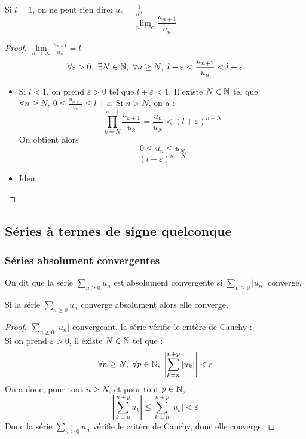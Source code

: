 \documentclass[../main.tex]{subfile}
\begin{document}
\begin{rema}
	Si $l = 1$, on ne peut rien dire:
	$u_n = \frac{1}{n^\alpha}$\\
	$$\lim\limits_{n \to \infty} \frac{u_{n+1}}{u_n}$$
\end{rema}

\begin{proof}
	$\lim\limits_{n \to \infty} \frac{u_{n+1}}{u_n} = l$\\
	$$\forall \varepsilon > 0, \ \exists N \in \mathbb{N}, \ \forall n \geq N, \ l-\varepsilon < \frac{u_{n+1}}{u_n} < l + \varepsilon$$
\begin{itemize}	
	\item Si $l < 1$, on prend $\varepsilon > 0$ tel que $l+ \varepsilon < 1$. 
	Il existe $N \in \mathbb{N}$ tel que $\forall n \geq N, \ 0 \leq \frac{u_{n+1}}{u_n} \leq l + \varepsilon$.
	Si $n > N$, on a :
	$$\prod\limits_{k = N}^{n-1} \frac{u_{k+1}}{u_k} = \frac{u_n}{u_N} < (l + \varepsilon)^{n - N}$$
	On obtient alors 
	$$0 \leq u_n \leq u_N$$
	$$(l + \varepsilon)^{n - N}$$%
	\item Idem 
\end{itemize}
\end{proof}


\subsection{Séries à termes de signe quelconque}
\subsubsection{Séries absolument convergentes}
\begin{defi}
	On dit que la série $\sum\limits_{n\geq 0} u_n$ est absolument convergente si $\sum\limits_{n\geq 0} |u_n|$ converge.
\end{defi}

\begin{theo}
	Si la série $\sum\limits_{n \geq 0} u_n$ converge absolument alors elle converge.
\end{theo}

\begin{proof}
	$\sum\limits_{n \geq 0} |u_n|$ convergeant, la série vérifie le critère de Cauchy :\\
	Si on prend $\varepsilon > 0$, il existe $N \in \mathbb{N}$ tel que :
	$$\forall n \geq N, \ \forall p \in \mathbb{N}, \ \left| \sum\limits_{k = n}^{n+p} |u_k| \right| < \varepsilon$$
	On a donc, pour tout $n \geq N$, et pour tout $p \in \mathbb{N}$, 
	$$\left| \sum\limits_{k=n}^{n+p} u_k \right| \leq \sum\limits_{k=n}^{n+p} |u_k| < \varepsilon$$
	Donc la série $\sum\limits_{n \geq 0}u_n$ vérifie le critère de Cauchy,
	donc elle converge.
\end{proof}
\end{document}
